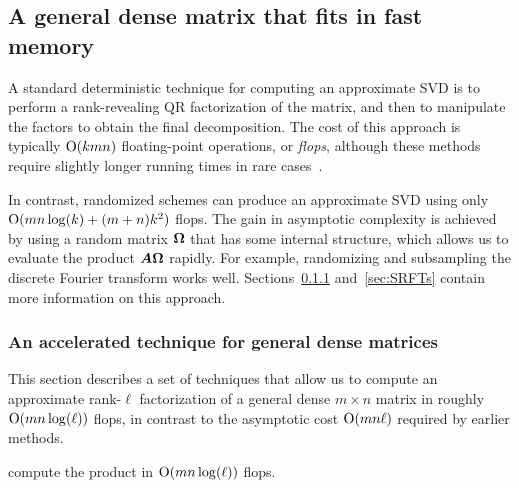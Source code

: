 \documentclass{article}
\begin{document}
\subsection{A general dense matrix that fits in fast memory}
\label{sec:intro_fits in RAM}

A standard deterministic technique for computing an approximate SVD is to
perform a rank-revealing QR factorization of the matrix,
and then to manipulate the factors to obtain the final decomposition.
The cost of this approach is typically $\mathrm{O}(kmn)$ floating-point
operations, or \textit{flops}, although these methods require slightly
longer running times in rare cases~\cite{gu_rrqr}.

In contrast, randomized schemes can produce an approximate SVD using
only $\mathrm{O}(mn\log(k) + (m+n)k^2)$ flops.  The gain in asymptotic
complexity is achieved by using a random matrix $\bm{\Omega}$ that
has some internal structure, which allows us to evaluate the
product $\bm{A\Omega}$ rapidly.  For example,
randomizing and subsampling the discrete Fourier transform
works well.  Sections~\ref{sec:ailonchazelle} and~\ref{sec:SRFTs}
contain more information on this approach.

\subsubsection{An accelerated technique for general dense matrices}
\label{sec:ailonchazelle}

This section describes a set of techniques that allow us to compute
an approximate rank-$\ell$ factorization of a general dense $m \times n$
matrix in roughly $\mathrm{O}(mn\log(\ell))$ flops, in contrast to the
asymptotic cost $\mathrm{O}(mn\ell)$ required by earlier methods.



compute the product in $\mathrm{O}(mn \log(\ell))$ flops.
\end{document}
